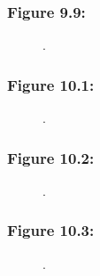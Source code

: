 \documentclass[t]{beamer}\usepackage[]{graphicx}\usepackage[]{color}
\begin{document}
\begin{frame}[label=Figure_9_9]
\frametitle{Figure 9.9: }
\begin{figure}[t]
\begin{minipage}[b]{\textwidth}
\centering

\caption{.}
\end{minipage}
\end{figure}
\end{frame}


\begin{frame}[label=Figure_10_1]
\frametitle{Figure 10.1: }
\begin{figure}[t]
\begin{minipage}[b]{\textwidth}
\centering

\caption{.}
\end{minipage}
\end{figure}
\end{frame}


\begin{frame}[label=Figure_10_2]
\frametitle{Figure 10.2: }
\begin{figure}[t]
\begin{minipage}[b]{\textwidth}
\centering

\caption{.}
\end{minipage}
\end{figure}
\end{frame}


\begin{frame}[label=Figure_10_3]
\frametitle{Figure 10.3: }
\begin{figure}[t]
\begin{minipage}[b]{\textwidth}
\centering

\caption{.}
\end{minipage}
\end{figure}
\end{frame}
\end{document}
